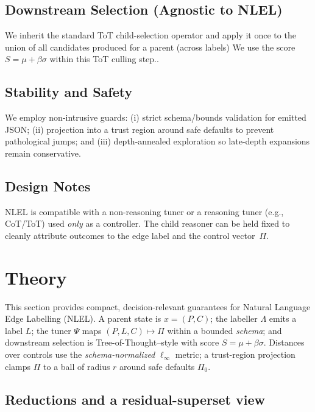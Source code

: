 \documentclass{article}
\theoremstyle{plain}
\theoremstyle{definition}
\theoremstyle{remark}
\begin{document}
\subsection{Downstream Selection (Agnostic to NLEL)}
We inherit the standard ToT child-selection operator and apply it once to the union of all candidates produced for a parent (across labels) We use the score $S=\mu+\beta\sigma$ within this ToT culling step..
\subsection{Stability and Safety}
We employ non-intrusive guards: (i) strict schema/bounds validation for emitted JSON; (ii) projection into a trust region around safe defaults to prevent pathological jumps; and (iii) depth-annealed exploration so late-depth expansions remain conservative.

\subsection{Design Notes}
NLEL is compatible with a non-reasoning tuner or a reasoning tuner (e.g., CoT/ToT) used \emph{only} as a controller. The child reasoner can be held fixed to cleanly attribute outcomes to the edge label and the control vector~$\Pi$.

\section{Theory}
\label{sec:theory}

This section provides compact, decision-relevant guarantees for Natural Language Edge Labelling (NLEL). 
A parent state is $x=(P,C)$; the labeller $\Lambda$ emits a label $L$; the tuner $\Psi$ maps $(P,L,C)\mapsto \Pi$ within a bounded \emph{schema}; and downstream selection is Tree-of-Thought--style with score $S=\mu+\beta\sigma$. 
Distances over controls use the \emph{schema-normalized} $\ell_\infty$ metric; a trust-region projection clamps $\Pi$ to a ball of radius $r$ around safe defaults $\Pi_0$. 

\subsection{Reductions and a residual-superset view}
\end{document}
